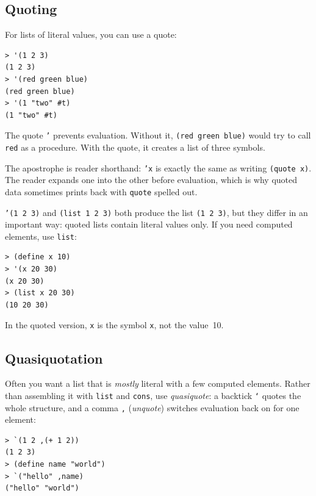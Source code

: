 \subsection{Quoting}

For lists of literal values, you can use a quote:

\begin{lstlisting}[style=repl]
> '(1 2 3)
(1 2 3)
> '(red green blue)
(red green blue)
> '(1 "two" #t)
(1 "two" #t)
\end{lstlisting}

The quote \texttt{'} prevents evaluation. Without it, \texttt{(red green blue)} would try to call \texttt{red} as a procedure. With the quote, it creates a list of three symbols.

The apostrophe is reader shorthand: \texttt{'x} is exactly the same as writing \texttt{(quote x)}. The reader expands one into the other before evaluation, which is why quoted data sometimes prints back with \texttt{quote} spelled out.

\begin{warning}
\texttt{'(1 2 3)} and \texttt{(list 1 2 3)} both produce the list \texttt{(1 2 3)}, but they differ in an important way: quoted lists contain literal values only. If you need computed elements, use \texttt{list}:

\begin{lstlisting}[style=repl]
> (define x 10)
> '(x 20 30)
(x 20 30)
> (list x 20 30)
(10 20 30)
\end{lstlisting}

In the quoted version, \texttt{x} is the symbol \texttt{x}, not the value~10.
\end{warning}

\subsection{Quasiquotation}

Often you want a list that is \emph{mostly} literal with a few computed elements. Rather than assembling it with \texttt{list} and \texttt{cons}, use \emph{quasiquote}: a backtick \texttt{`} quotes the whole structure, and a comma \texttt{,} (\emph{unquote}) switches evaluation back on for one element:

\begin{lstlisting}[style=repl]
> `(1 2 ,(+ 1 2))
(1 2 3)
> (define name "world")
> `("hello" ,name)
("hello" "world")
\end{lstlisting}

